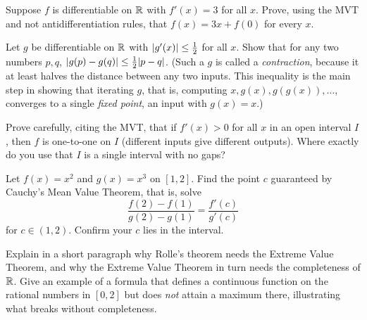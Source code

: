 \begin{exercise}
Suppose $f$ is differentiable on $\mathbb{R}$ with $f'(x)=3$ for all $x$. Prove, using the
MVT and not antidifferentiation rules, that $f(x)=3x+f(0)$ for every $x$.
\end{exercise}

\begin{exercise}
Let $g$ be differentiable on $\mathbb{R}$ with $\lvert g'(x)\rvert\le \tfrac12$ for all $x$. Show
that for any two numbers $p,q$, $\lvert g(p)-g(q)\rvert\le \tfrac12\lvert p-q\rvert$. (Such a $g$
is called a \emph{contraction}, because it at least halves the distance between any
two inputs. This inequality is the main step in showing that iterating $g$, that is,
computing $x, g(x), g(g(x)),\dots$, converges to a single \emph{fixed point}, an input
with $g(x)=x$.)
\end{exercise}

\begin{exercise}
Prove carefully, citing the MVT, that if $f'(x)>0$ for all $x$ in an open interval
$I$, then $f$ is one-to-one on $I$ (different inputs give different outputs). Where
exactly do you use that $I$ is a single interval with no gaps?
\end{exercise}

\begin{exercise}
Let $f(x)=x^2$ and $g(x)=x^3$ on $[1,2]$. Find the point $c$ guaranteed by Cauchy's
Mean Value Theorem, that is, solve
\[
  \frac{f(2)-f(1)}{g(2)-g(1)}=\frac{f'(c)}{g'(c)}
\]
for $c\in(1,2)$. Confirm your $c$ lies in the interval.
\end{exercise}

\begin{exercise}
Explain in a short paragraph why Rolle's theorem needs the Extreme Value
Theorem, and why the Extreme Value Theorem in turn needs the completeness of $\mathbb{R}$.
Give an example of a formula that defines a continuous function on the rational
numbers in $[0,2]$ but does \emph{not} attain a maximum there, illustrating what
breaks without completeness.
\end{exercise}
